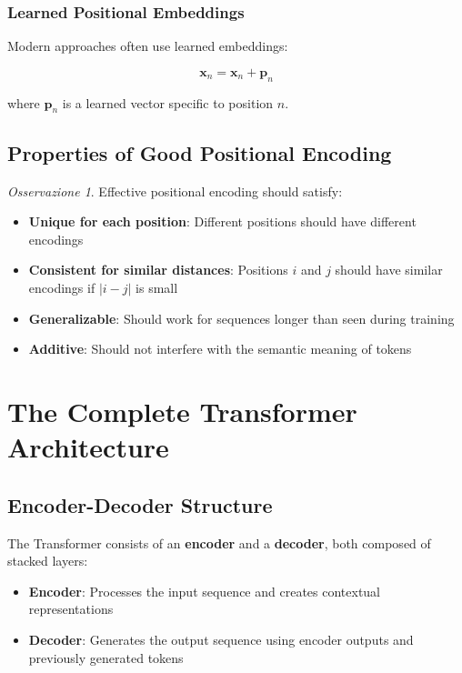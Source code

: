 \documentclass[11pt,a4paper]{article}
\theoremstyle{definition}
\theoremstyle{plain}
\theoremstyle{remark}
\newtheorem*{observation}{Osservazione}
\begin{document}
\subsubsection{Learned Positional Embeddings}

Modern approaches often use learned embeddings:

\[
\mathbf{x}_n = \mathbf{x}_n + \mathbf{p}_n
\]

where $\mathbf{p}_n$ is a learned vector specific to position $n$.

\subsection{Properties of Good Positional Encoding}

\begin{observation}
Effective positional encoding should satisfy:
\begin{itemize}
    \item \textbf{Unique for each position}: Different positions should have different encodings
    \item \textbf{Consistent for similar distances}: Positions $i$ and $j$ should have similar encodings if $|i-j|$ is small
    \item \textbf{Generalizable}: Should work for sequences longer than seen during training
    \item \textbf{Additive}: Should not interfere with the semantic meaning of tokens
\end{itemize}
\end{observation}

\section{The Complete Transformer Architecture}

\subsection{Encoder-Decoder Structure}

\begin{tcolorbox}[colback=blue!10!white,colframe=blue!75!black,title=\textbf{Transformer Architecture}]
The Transformer consists of an \textbf{encoder} and a \textbf{decoder}, both composed of stacked layers:

\begin{itemize}
    \item \textbf{Encoder}: Processes the input sequence and creates contextual representations
    \item \textbf{Decoder}: Generates the output sequence using encoder outputs and previously generated tokens
\end{itemize}
\end{tcolorbox}
\end{document}
